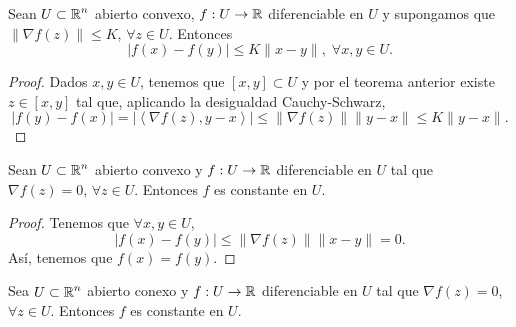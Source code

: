 \begin{colorary}
Sean $\displaystyle U \subset \mathbb{R}^{n} $ abierto convexo, $\displaystyle f : U \to \mathbb{R} $ diferenciable en $\displaystyle U $ y supongamos que $\displaystyle \|\nabla f\left(z\right) \| \leq K $, $\displaystyle \forall z \in U $. Entonces
\[|f\left(x\right)-f\left(y\right)|\leq K \|x-y\|, \; \forall x,y \in U .\]
\end{colorary}
\begin{proof}
	Dados $\displaystyle x,y \in U $, tenemos que $\displaystyle \left[x,y\right] \subset U $ y por el teorema anterior existe $\displaystyle z \in \left[x,y\right]  $ tal que, aplicando la desigualdad Cauchy-Schwarz,
	\[|f\left(y\right)-f\left(x\right)| = |\left\langle \nabla f\left(z\right), y-x \right\rangle| \leq \|\nabla f\left(z\right)\| \|y -x\| \leq K \|y-x\|  .\]
\end{proof}
\begin{colorary}
Sean $\displaystyle U \subset \mathbb{R}^{n} $ abierto convexo y $\displaystyle f : U \to \mathbb{R} $ diferenciable en $\displaystyle U $ tal que $\displaystyle \nabla f\left(z\right) = 0 $, $\displaystyle \forall z \in U $. Entonces $\displaystyle f $ es constante en $\displaystyle U $.
\end{colorary}
\begin{proof}
Tenemos que $\displaystyle \forall x,y \in U $, 
\[ \left|f\left(x\right)-f\left(y\right)\right| \leq \|\nabla f\left(z\right) \| \|x-y\| = 0 .\]
Así, tenemos que $\displaystyle f\left(x\right) = f\left(y\right) $.
\end{proof}
\begin{observation} %
Sea $\displaystyle U \subset \mathbb{R}^{n} $ abierto conexo y $\displaystyle f : U \to \mathbb{R} $ diferenciable en $\displaystyle U $ tal que $\displaystyle \nabla f\left(z\right) = 0 $, $\displaystyle \forall z \in U $. Entonces $\displaystyle f $ es constante en $\displaystyle U $. 
\end{observation}

